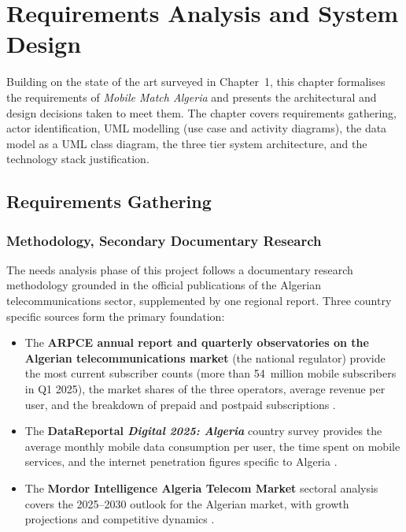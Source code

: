 
\chapter{Requirements Analysis and System Design}

Building on the state of the art surveyed in Chapter~1, this chapter formalises the requirements of \textit{Mobile Match Algeria} and presents the architectural and design decisions taken to meet them. The chapter covers requirements gathering, actor identification, UML modelling (use case and activity diagrams), the data model as a UML class diagram, the three tier system architecture, and the technology stack justification.

\section{Requirements Gathering}

\subsection{Methodology, Secondary Documentary Research}

The needs analysis phase of this project follows a documentary research methodology grounded in the official publications of the Algerian telecommunications sector, supplemented by one regional report. Three country specific sources form the primary foundation:

\begin{itemize}
  \item The \textbf{ARPCE annual report and quarterly observatories on the Algerian telecommunications market} (the national regulator) provide the most current subscriber counts (more than 54~million mobile subscribers in Q1 2025), the market shares of the three operators, average revenue per user, and the breakdown of prepaid and postpaid subscriptions \parencite{ARPCE2025, ARPCE2024}.
  \item The \textbf{DataReportal \textit{Digital 2025: Algeria}} country survey provides the average monthly mobile data consumption per user, the time spent on mobile services, and the internet penetration figures specific to Algeria \parencite{DataReportal2025}.
  \item The \textbf{Mordor Intelligence Algeria Telecom Market} sectoral analysis covers the 2025--2030 outlook for the Algerian market, with growth projections and competitive dynamics \parencite{Mordor2025}.
\end{itemize}

